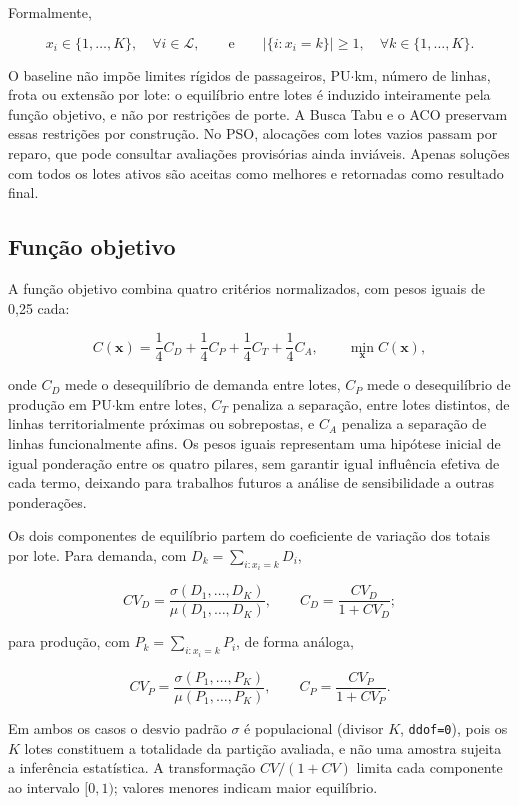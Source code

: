 \documentclass[12pt,a4paper]{article}
\begin{document}
Formalmente,

\[
x_i\in\{1,\ldots,K\},\quad \forall i\in\mathcal{L},
\qquad\text{e}\qquad
|\{i:x_i=k\}|\geq 1,\quad \forall k\in\{1,\ldots,K\}.
\]

O baseline não impõe limites rígidos de passageiros, PU$\cdot$km, número
de linhas, frota ou extensão por lote: o equilíbrio entre lotes é
induzido inteiramente pela função objetivo, e não por restrições de
porte. A Busca Tabu e o ACO preservam essas restrições por construção. No PSO,
alocações com lotes vazios passam por reparo, que pode consultar avaliações
provisórias ainda inviáveis. Apenas soluções com todos os lotes ativos são
aceitas como melhores e retornadas como resultado final.

\subsection{Função objetivo}

A função objetivo combina quatro critérios normalizados, com pesos
iguais de 0,25 cada:

\begin{equation}
C(\mathbf{x}) = \frac{1}{4}C_D + \frac{1}{4}C_P + \frac{1}{4}C_T + \frac{1}{4}C_A,
\qquad
\min_{\mathbf{x}} C(\mathbf{x}),
\label{eq:custo-total}
\end{equation}

onde \(C_D\) mede o desequilíbrio de demanda entre lotes, \(C_P\) mede o
desequilíbrio de produção em PU$\cdot$km entre lotes, \(C_T\) penaliza a
separação, entre lotes distintos, de linhas territorialmente próximas ou
sobrepostas, e \(C_A\) penaliza a separação de linhas funcionalmente
afins. Os pesos iguais representam uma hipótese inicial de igual ponderação
entre os quatro pilares, sem garantir igual influência efetiva de cada termo, deixando para trabalhos futuros a análise de
sensibilidade a outras ponderações.

Os dois componentes de equilíbrio partem do coeficiente de variação dos
totais por lote. Para demanda, com \(D_k=\sum_{i:x_i=k}D_i\),

\[
CV_D=\frac{\sigma(D_1,\ldots,D_K)}{\mu(D_1,\ldots,D_K)},
\qquad
C_D=\frac{CV_D}{1+CV_D};
\]

para produção, com \(P_k=\sum_{i:x_i=k}P_i\), de forma análoga,

\[
CV_P=\frac{\sigma(P_1,\ldots,P_K)}{\mu(P_1,\ldots,P_K)},
\qquad
C_P=\frac{CV_P}{1+CV_P}.
\]

Em ambos os casos o desvio padrão \(\sigma\) é populacional (divisor
\(K\), \texttt{ddof=0}), pois os \(K\) lotes constituem a totalidade da
partição avaliada, e não uma amostra sujeita a inferência estatística. A
transformação \(CV/(1+CV)\) limita cada componente ao intervalo
\([0,1)\); valores menores indicam maior equilíbrio.
\end{document}
